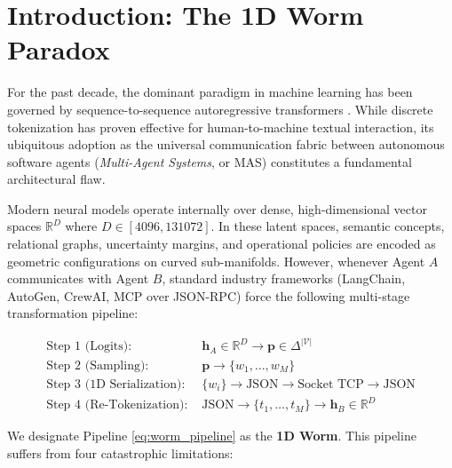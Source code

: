 \documentclass[11pt,twoside,a4paper]{article}
\theoremstyle{plain}
\theoremstyle{definition}
\theoremstyle{remark}
\newcommand{\R}{\mathbb{R}}
\begin{document}
\newpage
\tableofcontents
\newpage

\section{Introduction: The 1D Worm Paradox}
\label{sec:intro}

For the past decade, the dominant paradigm in machine learning has been governed by sequence-to-sequence autoregressive transformers \cite{vaswani2017attention}. While discrete tokenization has proven effective for human-to-machine textual interaction, its ubiquitous adoption as the universal communication fabric between autonomous software agents (\textit{Multi-Agent Systems}, or MAS) constitutes a fundamental architectural flaw.

Modern neural models operate internally over dense, high-dimensional vector spaces $\R^D$ where $D \in [4096, 131072]$. In these latent spaces, semantic concepts, relational graphs, uncertainty margins, and operational policies are encoded as geometric configurations on curved sub-manifolds. However, whenever Agent $A$ communicates with Agent $B$, standard industry frameworks (LangChain, AutoGen, CrewAI, MCP over JSON-RPC) force the following multi-stage transformation pipeline:

\begin{equation}
\begin{aligned}
\text{Step 1 (Logits): } & \mathbf{h}_A \in \mathbb{R}^D \to \mathbf{p} \in \Delta^{|\mathcal{V}|} \\
\text{Step 2 (Sampling): } & \mathbf{p} \to \{w_1, \dots, w_M\} \\
\text{Step 3 (1D Serialization): } & \{w_i\} \to \text{JSON} \to \text{Socket TCP} \to \text{JSON} \\
\text{Step 4 (Re-Tokenization): } & \text{JSON} \to \{t_1, \dots, t_M\} \to \mathbf{h}_B \in \mathbb{R}^D
\end{aligned}

\end{equation}

We designate Pipeline \eqref{eq:worm_pipeline} as the \textbf{1D Worm}. This pipeline suffers from four catastrophic limitations:
\end{document}
